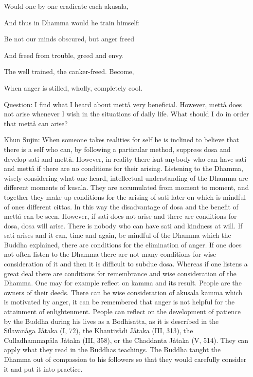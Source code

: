 \documentclass[12pt,twoside]{article}
\begin{document}
Would one by one eradicate each akusala, 

And thus in Dhamma would he train himself:

Be not our minds obscured, but anger freed 

And freed from trouble, greed and envy. 

The well trained, the canker{}-freed. Become,

When anger is stilled, wholly, completely cool. 


\bigskip

Question: I find what I heard about mett{\aa} very beneficial. However,
mett{\aa} does not arise whenever I wish in the situations of daily
life. What should I do in order that mett{\aa} can arise? 

Khun Sujin: When someone takes realities for self he is inclined to
believe that there is a self who can, by following a particular method,
suppress dosa and develop sati and mett{\aa}. However, in reality there
isn{\textquotesingle}t anybody who can have sati and mett{\aa} if there
are no conditions for their arising. Listening to the Dhamma, wisely
considering what one heard, intellectual understanding of the Dhamma
are different moments of kusala. They are accumulated from moment to
moment, and together they make up conditions for the arising of sati
later on which is mindful of one{\textquotesingle}s different cittas.
In this way the disadvantage of dosa and the benefit of mett{\aa} can
be seen. However, if sati does not arise and there are conditions for
dosa, dosa will arise. There is nobody who can have sati and kindness
at will. If sati arises and it can, time and again, be mindful of the
Dhamma which the Buddha explained, there are conditions for the
elimination of anger. If one does not often listen to the Dhamma there
are not many conditions for wise consideration of it and then it is
difficult to subdue dosa. Whereas if one listens a great deal there are
conditions for remembrance and wise consideration of the Dhamma. One
may for example reflect on kamma and its result. People are the owners
of their deeds. There can be wise consideration of akusala kamma which
is motivated by anger, it can be remembered that anger is not helpful
for the attainment of enlightenment. People can reflect on the
development of patience by the Buddha during his lives as a Bodhisatta,
as it is described in the
{\textasciigrave}{\textasciigrave}S\'ilavan{\aa}ga
J{\aa}taka{\textquotesingle}{\textquotesingle} (I, 72), the
{\textasciigrave}{\textasciigrave}Khantiv{\aa}di
J{\aa}taka{\textquotesingle}{\textquotesingle} (III, 313), the
{\textasciigrave}{\textasciigrave}Culladhammap{\aa}la
J{\aa}taka{\textquotesingle}{\textquotesingle} (III, 358), or the
{\textasciigrave}{\textasciigrave}Chaddanta
J{\aa}taka{\textquotesingle}{\textquotesingle} (V, 514). They can apply
what they read in the Buddha{\textquotesingle}s teachings. The Buddha
taught the Dhamma out of compassion to his followers so that they would
carefully consider it and put it into practice. 
\end{document}
